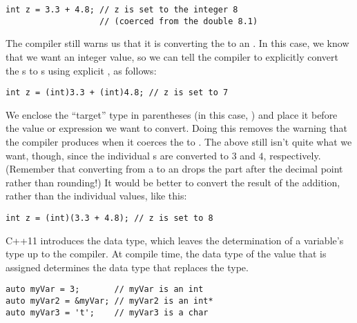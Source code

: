 \noindent\begin{minipage}{\linewidth}\begin{lstlisting}
int z = 3.3 + 4.8; // z is set to the integer 8 
                   // (coerced from the double 8.1)
\end{lstlisting}\end{minipage}

The compiler still warns us that it is converting the  to an . 
In this case, we know that we want an integer value, so we can tell the compiler to explicitly convert the s to s using explicit , as follows:

\noindent\begin{minipage}{\linewidth}\begin{lstlisting}
int z = (int)3.3 + (int)4.8; // z is set to 7
\end{lstlisting}\end{minipage}

We enclose the ``target'' type in parentheses (in this case, ) and place it before the value or expression we want to convert. 
Doing this removes the warning that the compiler produces when it coerces the  to . 
The above still isn't quite what we want, though, since the individual s are converted to $3$ and $4$, respectively. 
(Remember that converting from a  to an  drops the part after the decimal point rather than rounding!) 
It would be better to convert the result of the addition, rather than the individual values, like this: \nopagebreak[4]

\noindent\begin{minipage}{\linewidth}\begin{lstlisting}
int z = (int)(3.3 + 4.8); // z is set to 8
\end{lstlisting}\end{minipage}


C++11 introduces the  data type, which leaves the determination of a variable's type up to the compiler. 
At compile time, the data type of the value that is assigned determines the data type that replaces the  type.

\noindent\begin{minipage}{\linewidth}\begin{lstlisting}
auto myVar = 3;       // myVar is an int
auto myVar2 = &myVar; // myVar2 is an int*
auto myVar3 = 't';    // myVar3 is a char
\end{lstlisting}\end{minipage}

